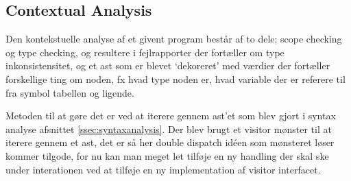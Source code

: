 \subsection{Contextual Analysis}\wip
    Den kontekstuelle analyse af et givent program består af to dele; scope checking og type checking, og resultere i fejlrapporter der fortæller om type inkonsistensitet, og et \gls{ast} som er blevet \enquote*{dekoreret} med værdier der fortæller forskellige ting om noden, fx hvad type noden er, hvad variable der er referere til fra symbol tabellen og ligende. %
    
    Metoden til at gøre det er ved at iterere gennem \gls{ast}'et som blev gjort i syntax analyse afsnittet \ref{ssec:syntaxanalysis}. Der blev brugt et visitor mønster til at iterere gennem et \gls{ast}, det er så her double dispatch idéen som mønsteret løser kommer tilgode, for nu kan man meget let tilføje en ny handling der skal ske under interationen ved at tilføje en ny implementation af visitor interfacet.